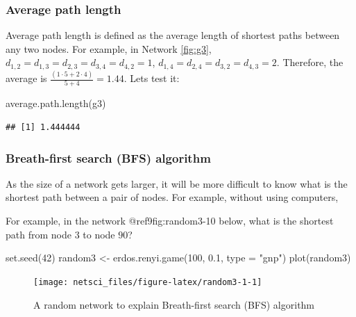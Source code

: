 \documentclass[
]{krantz}
\makeatletter
\newenvironment{Shaded}{\begin{snugshade}}{\end{snugshade}}
\newcommand{\AttributeTok}[1]{\textcolor[rgb]{0.61,0.61,0.61}{#1}}
\newcommand{\DecValTok}[1]{\textcolor[rgb]{0.06,0.06,0.06}{#1}}
\newcommand{\FloatTok}[1]{\textcolor[rgb]{0.06,0.06,0.06}{#1}}
\newcommand{\FunctionTok}[1]{\textcolor[rgb]{0,0,0}{#1}}
\newcommand{\NormalTok}[1]{#1}
\newcommand{\OtherTok}[1]{\textcolor[rgb]{0.37,0.37,0.37}{#1}}
\newcommand{\StringTok}[1]{\textcolor[rgb]{0.5,0.5,0.5}{#1}}
\newenvironment{kframe}{%
\medskip{}
\setlength{\fboxsep}{.8em}
 \def\at@end@of@kframe{}%
 \ifinner\ifhmode%
  \def\at@end@of@kframe{\end{minipage}}%
  \begin{minipage}{\columnwidth}%
 \fi\fi%
 \def\FrameCommand##1{\hskip\@totalleftmargin \hskip-\fboxsep
 \colorbox{shadecolor}{##1}\hskip-\fboxsep
     \hskip-\linewidth \hskip-\@totalleftmargin \hskip\columnwidth}%
 \MakeFramed {\advance\hsize-\width
   \@totalleftmargin\z@ \linewidth\hsize
   \@setminipage}}%
 {\par\unskip\endMakeFramed%
 \at@end@of@kframe}
\renewenvironment{Shaded}{\begin{kframe}}{\end{kframe}}
\makeatother
\begin{document}
\hypertarget{average-path-length}{%
\subsubsection{Average path length}\label{average-path-length}}

Average path length is defined as the average length of shortest paths between any two nodes. For example, in Network \ref{fig:g3}, \(d_{1,2} = d_{1,3} = d_{2,3} = d_{3,4} = d_{4,2} = 1\), \(d_{1,4} = d_{2,4} = d_{3,2} = d_{4,3} = 2\). Therefore, the average is \(\frac{(1 \cdot 5 + 2 \cdot 4)}{5 + 4} = 1.44\). Lets test it:

\begin{Shaded}
\begin{Highlighting}[]
\FunctionTok{average.path.length}\NormalTok{(g3)}
\end{Highlighting}
\end{Shaded}

\begin{verbatim}
## [1] 1.444444
\end{verbatim}

\hypertarget{breath-first-search-bfs-algorithm}{%
\subsubsection{Breath-first search (BFS) algorithm}\label{breath-first-search-bfs-algorithm}}

As the size of a network gets larger, it will be more difficult to know what is the shortest path between a pair of nodes. For example, without using computers,

For example, in the network @ref9fig:random3-10 below, what is the shortest path from node \(3\) to node \(90\)?

\begin{Shaded}
\begin{Highlighting}[]
\FunctionTok{set.seed}\NormalTok{(}\DecValTok{42}\NormalTok{)}
\NormalTok{random3 }\OtherTok{\textless{}{-}} \FunctionTok{erdos.renyi.game}\NormalTok{(}\DecValTok{100}\NormalTok{, }\FloatTok{0.1}\NormalTok{, }\AttributeTok{type =} \StringTok{"gnp"}\NormalTok{)}
\FunctionTok{plot}\NormalTok{(random3)}
\end{Highlighting}
\end{Shaded}

\begin{figure}

{\centering \texttt{[image: netsci\_files/figure-latex/random3-1-1]} 

}

\caption{A random network to explain Breath-first search (BFS) algorithm}\label{fig:random3-1}
\end{figure}
\end{document}

